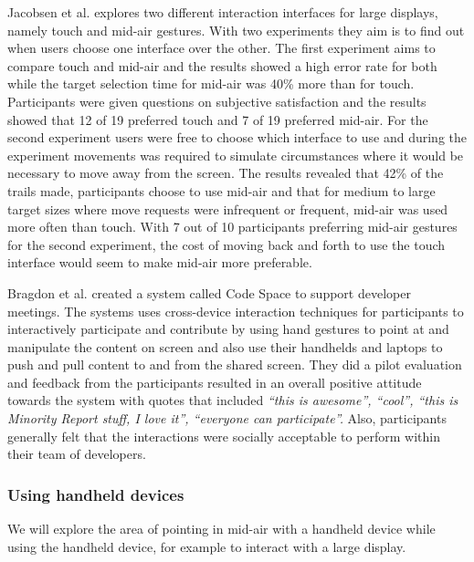 Jacobsen et al. \cite{Jakobsen:2015} explores two different interaction interfaces for large displays, namely touch and mid-air gestures.
With two experiments they aim is to find out when users choose one interface over the other.
The first experiment aims to compare touch and mid-air and the results showed a high error rate for both while the target selection time for mid-air was 40\% more than for touch.
Participants were given questions on subjective satisfaction and the results showed that 12 of 19 preferred touch and 7 of 19 preferred mid-air.
For the second experiment users were free to choose which interface to use and during the experiment movements was required to simulate circumstances where it would be necessary to move away from the screen.
The results revealed that 42\% of the trails made, participants choose to use mid-air and that for medium to large target sizes where move requests were infrequent or frequent, mid-air was used more often than touch.
With 7 out of 10 participants preferring mid-air gestures for the second experiment, the cost of moving back and forth to use the touch interface would seem to make mid-air more preferable.

Bragdon et al. \cite{Bragdon:2011} created a system called Code Space to support developer meetings.
The systems uses cross-device interaction techniques for participants to interactively participate and contribute by using hand gestures to point at and manipulate the content on screen and also use their handhelds and laptops to push and pull content to and from the shared screen.
They did a pilot evaluation and feedback from the participants resulted in an overall positive attitude towards the system with quotes that included \textit{``this is awesome'', ``cool'', ``this is Minority Report stuff, I love it'', ``everyone can participate''.}
Also, participants generally felt that the interactions were socially acceptable to perform within their team of developers.

\subsubsection{Using handheld devices} \label{sec:midAirPointingHandheld}
We will explore the area of pointing in mid-air with a handheld device while using the handheld device, for example to interact with a large display.

